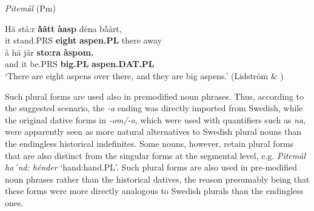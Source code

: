 
\item 

\textit{Pitemål} (Pm)



 \ea\label{}
\gll Hä  stå:r  \textbf{\`{å}ått} \textbf{àasp} d\=ena  b\`{å}årt,\\


it  stand.PRS  \textbf{eight} \textbf{aspen.PL} there  away\\

 \ea\label{}
\gll å  hä  jär  \textbf{sto:ra} \textbf{àspom.}\\


and  it  be.PRS  \textbf{big.PL} \textbf{aspen.DAT.PL}\\

\glt ‘There are eight aspens over there, and they are big aspens.’ (Lidström \& \citet[20]{Berglund1991}) 

\z

Such plural forms are used also in premodified noun phrases. Thus, according to the suggested scenario, the\textit{ {}-a} ending was directly imported from Swedish, while the original dative forms in\textit{ {}-om/-o,} which were used with quantifiers such as \textit{na},\textit{ }were apparently seen as more natural alternatives to Swedish plural nouns than the endingless historical indefinites. Some nouns, however, retain plural forms that are also distinct from the singular forms at the segmental level, e.g. \textit{Pitemål} \textit{ha´nd: hénder} ‘hand:hand.PL’.  Such plural forms are also used in pre-modified noun phrases rather than the historical datives, the reason presumably being that these forms were more directly analogous to Swedish plurals than the endingless ones. 


